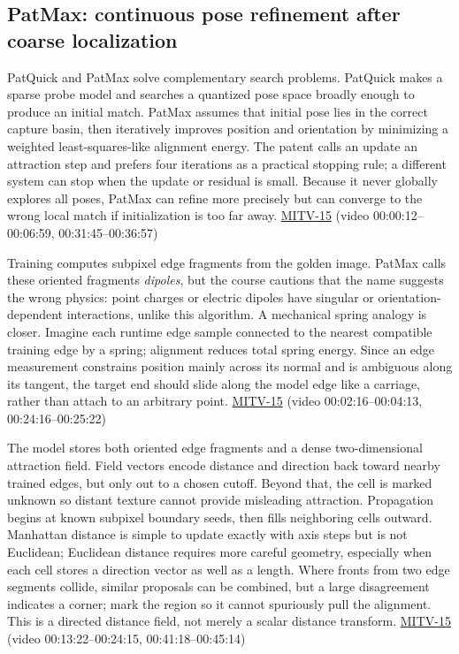 \subsection{PatMax: continuous pose refinement after coarse localization}\label{04-visual-computing-ii-ch030-patmax-continuous-pose-refinement-after-coarse-localization}

PatQuick and PatMax solve complementary search problems. PatQuick makes a sparse probe model and searches a quantized pose space broadly enough to produce an initial match. PatMax assumes that initial pose lies in the correct capture basin, then iteratively improves position and orientation by minimizing a weighted least-squares-like alignment energy. The patent calls an update an attraction step and prefers four iterations as a practical stopping rule; a different system can stop when the update or residual is small. Because it never globally explores all poses, PatMax can refine more precisely but can converge to the wrong local match if initialization is too far away. \hyperref[04-visual-computing-ii-ch036-mitv-15---alignment-patmax-distance-field-filtering-and-sub-sampling-us-7065262]{MITV-15} (video 00:00:12--00:06:59, 00:31:45--00:36:57)

Training computes subpixel edge fragments from the golden image. PatMax calls these oriented fragments \emph{dipoles}, but the course cautions that the name suggests the wrong physics: point charges or electric dipoles have singular or orientation-dependent interactions, unlike this algorithm. A mechanical spring analogy is closer. Imagine each runtime edge sample connected to the nearest compatible training edge by a spring; alignment reduces total spring energy. Since an edge measurement constrains position mainly across its normal and is ambiguous along its tangent, the target end should slide along the model edge like a carriage, rather than attach to an arbitrary point. \hyperref[04-visual-computing-ii-ch036-mitv-15---alignment-patmax-distance-field-filtering-and-sub-sampling-us-7065262]{MITV-15} (video 00:02:16--00:04:13, 00:24:16--00:25:22)

The model stores both oriented edge fragments and a dense two-dimensional attraction field. Field vectors encode distance and direction back toward nearby trained edges, but only out to a chosen cutoff. Beyond that, the cell is marked unknown so distant texture cannot provide misleading attraction. Propagation begins at known subpixel boundary seeds, then fills neighboring cells outward. Manhattan distance is simple to update exactly with axis steps but is not Euclidean; Euclidean distance requires more careful geometry, especially when each cell stores a direction vector as well as a length. Where fronts from two edge segments collide, similar proposals can be combined, but a large disagreement indicates a corner; mark the region so it cannot spuriously pull the alignment. This is a directed distance field, not merely a scalar distance transform. \hyperref[04-visual-computing-ii-ch036-mitv-15---alignment-patmax-distance-field-filtering-and-sub-sampling-us-7065262]{MITV-15} (video 00:13:22--00:24:15, 00:41:18--00:45:14)

